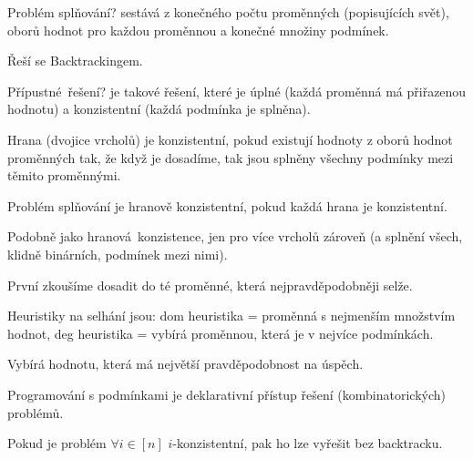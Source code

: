 \documentclass[12pt]{article}					%
\begin{document}
\begin{definice}
	Problém splňování? sestává z konečného počtu proměnných (popisujících svět), oborů hodnot pro každou proměnnou a konečné množiny podmínek.

	Řeší se Backtrackingem.
\end{definice}

\begin{definice}
	Přípustné řešení? je takové řešení, které je úplné (každá proměnná má přiřazenou hodnotu) a konzistentní (každá podmínka je splněna).
\end{definice}

\begin{definice}
	Hrana (dvojice vrcholů) je konzistentní, pokud existují hodnoty z oborů hodnot proměnných tak, že když je dosadíme, tak jsou splněny všechny podmínky mezi těmito proměnnými.

	Problém splňování je hranově konzistentní, pokud každá hrana je konzistentní.
\end{definice}

\begin{definice}[k-konzistence]
	Podobně jako hranová konzistence, jen pro více vrcholů zároveň (a splnění všech, klidně binárních, podmínek mezi nimi).
\end{definice}

\begin{definice}
	První zkoušíme dosadit do té proměnné, která nejpravděpodobněji selže.

	Heuristiky na selhání jsou: dom heuristika = proměnná s nejmenším množstvím hodnot, deg heuristika = vybírá proměnnou, která je v nejvíce podmínkách.
\end{definice}

\begin{definice}
	Vybírá hodnotu, která má největší pravděpodobnost na úspěch.
\end{definice}

\begin{definice}
	Programování s podmínkami je deklarativní přístup řešení (kombinatorických) problémů.
\end{definice}

\begin{veta}
	Pokud je problém $\forall i \in [n]$ $i$-konzistentní, pak ho lze vyřešit bez backtracku.
\end{veta}
\end{document}
